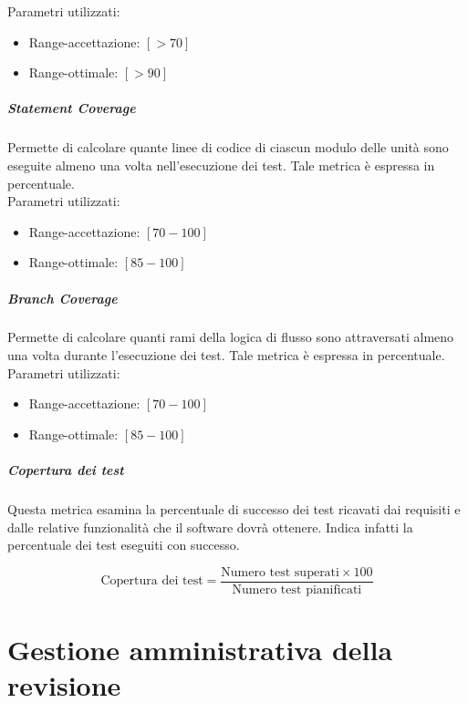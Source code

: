 {  Parametri utilizzati:
  \begin{itemize}
  \item Range-accettazione: $[>70]$
  \item Range-ottimale: $[>90]$\\
  \end{itemize}



  \subparagraph{Statement Coverage}
  Permette di calcolare quante linee di codice di ciascun modulo delle unità sono eseguite almeno
  una volta nell'esecuzione dei test. Tale metrica è espressa in percentuale.\\

  Parametri utilizzati:
  \begin{itemize}
  \item Range-accettazione: $[70 - 100]$
  \item Range-ottimale: $[85 - 100]$
  \end{itemize}

  \subparagraph{Branch Coverage}
  Permette di calcolare quanti rami della logica di flusso sono attraversati almeno una volta durante
  l'esecuzione dei test. Tale metrica è espressa in percentuale.\\

  Parametri utilizzati:
  \begin{itemize}
  \item Range-accettazione: $[70 - 100]$
  \item Range-ottimale: $[85 - 100]$
  \end{itemize}

  \subparagraph{Copertura dei test}
Questa metrica esamina la percentuale di successo dei test ricavati dai requisiti e dalle relative
funzionalità che il software dovrà ottenere. Indica infatti la percentuale dei test eseguiti con
successo.

$$
\text{Copertura dei test} = 
\frac{\text{Numero test superati} \times 100}
{\text{Numero test pianificati}}
$$



  \section{Gestione amministrativa della revisione}

}
